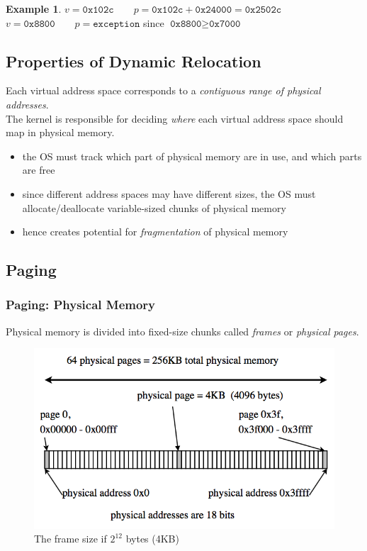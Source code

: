 \documentclass[12pt]{article}
\theoremstyle{plain}
\theoremstyle{definition}
\newtheorem*{ex*}{Example}
\begin{document}
\begin{ex*}
$v = \texttt{0x102c} \qquad p = \texttt{0x102c} + \texttt{0x24000} = \texttt{0x2502c}$ \\
$v = \texttt{0x8800} \qquad p = \texttt{exception}$ since $\texttt{0x8800} \geq \texttt{0x7000}$
\end{ex*}

\subsection{Properties of Dynamic Relocation}
Each virtual address space corresponds to a \emph{contiguous range of physical addresses}. \\
The kernel is responsible for deciding \emph{where} each virtual address space should map in physical memory.
\begin{itemize}
  \item the OS must track which part of physical memory are in use, and which parts are free
  \item since different address spaces may have different sizes, the OS must allocate/deallocate variable-sized chunks of physical memory
  \item hence creates potential for \emph{fragmentation} of physical memory
\end{itemize}

\subsection{Paging}
\subsubsection{Paging: Physical Memory}
Physical memory is divided into fixed-size chunks called \emph{frames} or \emph{physical pages}.
\begin{figure}[H]
  \centering
  \includegraphics[scale=0.7]{pictures/paging_phys_mem.png}
  \caption{The frame size if $2^{12}$ bytes (4KB)}
  \label{fig:p_phys_mem}
\end{figure}
\end{document}
